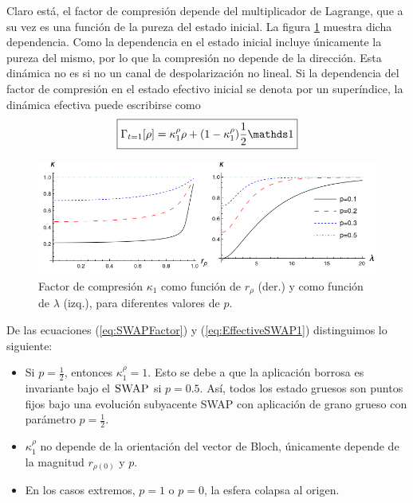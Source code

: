 Claro está, el factor de compresión depende del multiplicador de Lagrange, que a su vez es una función de la pureza del estado inicial. La figura \ref{fig:SWAPFactor2Drl} muestra dicha dependencia. Como la dependencia en el estado inicial incluye únicamente la pureza del mismo, por lo que la compresión no depende de la dirección. Esta dinámica no es si no un canal de despolarización no lineal. Si la dependencia del factor de compresión en el estado efectivo inicial se denota por un superíndice, la dinámica efectiva puede escribirse como
\begin{equation}\label{eq:EffectiveSWAP1}
  \boxed{\Gamma_{t=1}[\rho]=\kappa_{1}^{\rho}\rho+(1-\kappa_{1}^{\rho})\frac{1}{2}\Id}
\end{equation}
\begin{figure}[h!]
  \centering
  \includegraphics[width=0.9\linewidth]{chapter3/figures_toy/ContractionFactorSWAP_2D_both.png}
  \caption{Factor de compresión $\kappa_{1}$ como función de $r_{\rho}$ (der.) y como función de $\lambda$ (izq.), para diferentes valores de $p$.}
  \label{fig:SWAPFactor2Drl}
\end{figure}

De las ecuaciones (\ref{eq:SWAPFactor}) y (\ref{eq:EffectiveSWAP1}) distinguimos lo siguiente:
\begin{itemize}
  \item Si $p=\frac{1}{2}$, entonces $\kappa_{1}^{\rho}=1$. Esto se debe a que la aplicación borrosa es invariante bajo el $\textsc{SWAP}$ si $p=0.5$. Así, todos los estado gruesos son puntos fijos bajo una evolución subyacente SWAP con aplicación de grano grueso con parámetro $p=\frac{1}{2}$.
  \item $\kappa_{1}^{\rho}$ no depende de la orientación del vector de Bloch, únicamente depende de la magnitud $r_{\rho(0)}$ y $p$.
  \item En los casos extremos, $p=1$ o $p=0$, la esfera colapsa al origen.
\end{itemize}


